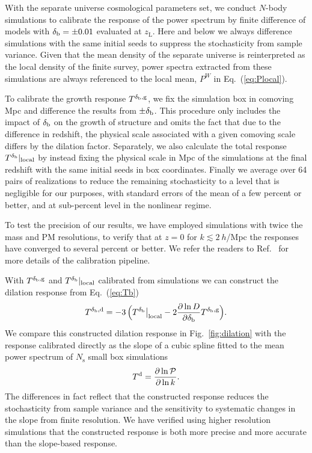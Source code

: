 \documentclass[prd,twocolumn,amsmath,amssymb,floatfix,superscriptaddress]{revtex4-1}
\newcommand{\br}{{\rm b}}
\newcommand{\Dv}{{\cal P}}
\begin{document}
{{With the separate universe cosmological parameters set,
we conduct $N$-body simulations to calibrate the response of the power spectrum
by finite difference of models
with 
$\delta_\br =\pm0.01$  evaluated at $z_\textrm{L}$.  
Here and below we always difference simulations
with the  same initial seeds to
suppress the stochasticity from sample variance.
Given that the mean density of the separate universe is reinterpreted as
the local
density of the finite survey, power spectra extracted from these simulations
are always referenced to the local mean, $P^W$ in Eq.~(\ref{eq:Plocal}).


To calibrate the growth response $T^{\delta_\br,{\rm g}}$, we fix the simulation box
in comoving Mpc and difference the results from $\pm \delta_\br$.
This procedure only includes the impact of 
$\delta_\br$ on the growth of structure and omits the fact that due to the difference
in redshift, the physical scale associated with a given comoving scale differs by the
dilation factor.    Separately, we also calculate the total response
$T^{\delta_\br}|_{\rm local}$ by instead fixing the physical scale in Mpc of the simulations
at the final redshift with the same initial seeds in box coordinates.   
Finally we average over 64 pairs of realizations
to reduce the remaining stochasticity to a level that is negligible for our purposes,
with standard errors of the mean of a few percent or better, and at sub-percent level
in the nonlinear regime.

To test the precision of our results,
we have employed simulations with twice the mass and PM resolutions,
to verify that at $z=0$ for $k \lesssim 2~ h$/Mpc the responses have converged to several percent or better.
We refer the readers to Ref.~\cite{Lietal:14} for more details of the calibration pipeline.

With $T^{\delta_\br,{\rm g}}$ and $T^{\delta_\br}|_{\rm local}$ calibrated from simulations
we can construct the dilation response from Eq.~(\ref{eq:Tb})
\begin{equation}
     T^{\delta_\br,\textrm{d}} = -3 \, \Big(  T^{\delta_\br} \big|_\textrm{local}
    - 2\frac{\partial\ln D}{\partial\delta_\br}  T^{\delta_\br,\textrm{g}} \Big).
    \label{eq:Tdd}
\end{equation}
We compare this constructed dilation response in Fig.~\ref{fig:dilation} with
the response calibrated directly as the slope of a
cubic spline fitted to
the mean power spectrum of $N_\textrm{s}$ small box simulations
\begin{equation}
    T^\textrm{d} = \frac{\partial \ln\Dv}{\partial \ln k}.
\end{equation}
The differences in fact reflect that the constructed response reduces the stochasticity from sample variance and the sensitivity to systematic changes in the slope from finite 
resolution.   We have verified using higher resolution simulations that the constructed
response is both more precise and more accurate than the slope-based response.







}}
\end{document}
